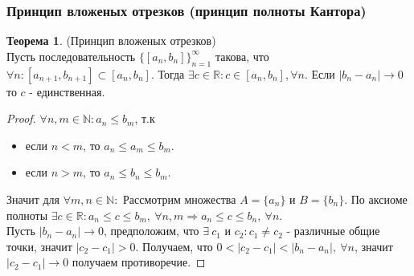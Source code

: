 \documentclass[a4paper, 12pt]{article}
\newcommand{\N}{\mathbb{N}}
\newcommand{\R}{\mathbb{R}}
\theoremstyle{definition}
\newtheorem*{theorem}{Теорема}
\begin{document}
        \subsubsection{Принцип вложеных отрезков (принцип полноты Кантора)}
        \begin{theorem} (Принцип вложеных отрезков) \\
            Пусть последовательность $\{[a_n,b_n]\}_{n=1}^{\infty}$ такова, что $\forall n: [a_{n+1},b_{n+1}]\subset [a_n,b_n]$. Тогда $\exists c\in \R: c\in [a_n,b_n], \forall n$. Если $|b_n-a_n|\to 0$ то $c$ - единственная.
        \end{theorem} 
        \begin{proof}
            $\forall n,m\in \N: a_n\leq b_m$, т.к
            \begin{itemize}
                \item если $n<m$, то $a_n\leq a_m\leq b_m$.
                \item если $n>m$, то $a_n\leq b_n\leq b_m$.
            \end{itemize}
            Значит для $\forall m,n\in \N: $
            Рассмотрим множества $A=\{a_n\}$ и $B=\{b_n\}$. По аксиоме полноты $\exists c\in \R: a_n\leq c\leq b_m,\ \forall n,m \Rightarrow a_n\leq c\leq b_n,\ \forall n$.\\
            Пусть $|b_n-a_n|\to 0$, предположим, что $\exists\ c_1$ и $c_2: c_1\ne c_2$ - различные общие точки, значит $|c_2-c_1|>0$. Получаем, что $0<|c_2-c_1|<|b_n-a_n|,\ \forall n$, значит $|c_2-c_1|\to 0$ получаем противоречие.
        \end{proof}
\end{document}
